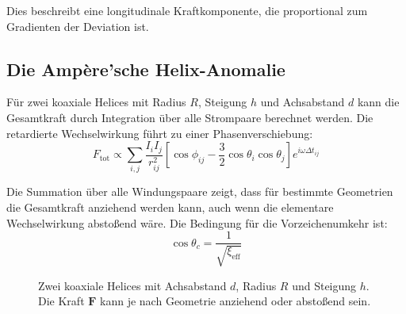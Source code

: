 	Dies beschreibt eine longitudinale Kraftkomponente, die proportional zum Gradienten der Deviation ist.
	
	\subsection{Die Ampère'sche Helix-Anomalie}
	Für zwei koaxiale Helices mit Radius $R$, Steigung $h$ und Achsabstand $d$ kann die Gesamtkraft durch Integration über alle Strompaare berechnet werden. Die retardierte Wechselwirkung führt zu einer Phasenverschiebung:
	\begin{equation}
		F_{\text{tot}} \propto \sum_{i,j} \frac{I_i I_j}{r_{ij}^2} \left[ \cos\phi_{ij} - \frac{3}{2} \cos\theta_i \cos\theta_j \right] e^{i\omega \Delta t_{ij}} \label{eq:helix_force}
	\end{equation}
	
	Die Summation über alle Windungspaare zeigt, dass für bestimmte Geometrien die Gesamtkraft anziehend werden kann, auch wenn die elementare Wechselwirkung abstoßend wäre. Die Bedingung für die Vorzeichenumkehr ist:
	\begin{equation}
		\cos\theta_c = \frac{1}{\sqrt{\xi_{\text{eff}}}} \label{eq:critical_angle}
	\end{equation}
	
	\begin{figure}[h]
		\centering
		\caption{Zwei koaxiale Helices mit Achsabstand $d$, Radius $R$ und Steigung $h$. Die Kraft $\mathbf{F}$ kann je nach Geometrie anziehend oder abstoßend sein.}
		\label{fig:helices}
	\end{figure}
	
